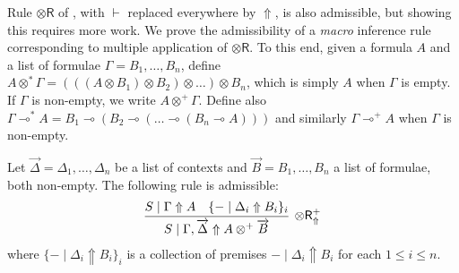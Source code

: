 \documentclass[runningheads]{llncs}
\renewcommand{\vec}{\overrightarrow}
\newcommand{\tr}{\otimes \mathsf{R}}
\newcommand{\otR}{\tr}
\newcommand{\ot}{\otimes}
\newcommand{\lolli}{\multimap}
\newcommand{\up}{\Uparrow}
\begin{document}
Rule $\otR$ of , with $\vdash$ replaced everywhere by $\up$, is also admissible, but showing this requires more work. We prove the admissibility of a \emph{macro} inference rule corresponding to multiple application of $\otR$. To this end, given a formula $A$ and a list of formulae $\Gamma = B_1,\dots,B_n$, define $A \ot^* \Gamma = (((A \ot B_1) \ot B_2) \ot \dots) \ot B_n$, which is simply $A$ when $\Gamma$ is empty. If $\Gamma$ is non-empty, we write $A \ot^+ \Gamma$. Define also $\Gamma \lolli^* A = B_1 \lolli (B_2 \lolli (\dots \lolli (B_n \lolli A)))$ and similarly $\Gamma\lolli^+ A$ when $\Gamma$ is non-empty.
\begin{proposition}\label{prop:otR}
  Let $\vec{\Delta} = \Delta_1,\dots,\Delta_n$ be a list of contexts and $\vec{B} = B_1,\dots,B_n$ a list of formulae, both non-empty.
  The following rule is admissible:
  \begin{equation*}\label{eq:otR}  
  \begin{array}{c}
    \infer[\otR^+_\up]{S \mid \Gamma , \vec{\Delta} \up A \ot^+ \vec{B}}{
      S \mid \Gamma \up A
      &
      \{ - \mid \Delta_i \up B_i \}_{i}
    }
  \end{array}
  \end{equation*}
  where $\{ - \mid \Delta_i \up B_i \}_{i}$ is a collection of premises $- \mid \Delta_i \up B_i$ for each $1 \le i \le n$.
\end{proposition}
\end{document}
